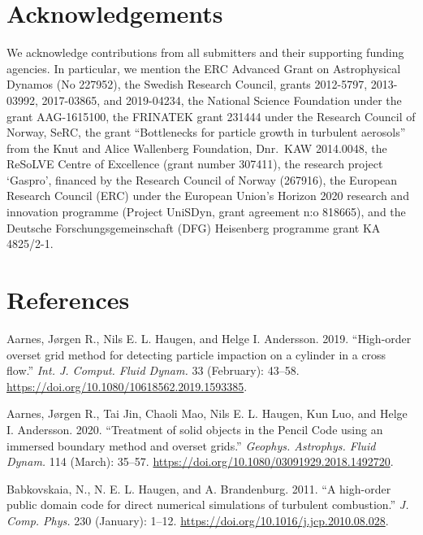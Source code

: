 \documentclass[10pt,a4paper,onecolumn]{article}
\let\textttOrig=\texttt
\def\texttt#1{\expandafter\textttOrig{\seqsplit{#1}}}
\let\addcontentslineOrig=\addcontentsline
\def\addcontentsline#1#2#3{\bgroup
  \let\texttt=\textttOrig\addcontentslineOrig{#1}{#2}{#3}\egroup}
\begin{document}
\hypertarget{acknowledgements}{%
\section{Acknowledgements}\label{acknowledgements}}

We acknowledge contributions from all submitters and their supporting
funding agencies. In particular, we mention the ERC Advanced Grant on
Astrophysical Dynamos (No 227952), the Swedish Research Council, grants
2012-5797, 2013-03992, 2017-03865, and 2019-04234, the National Science
Foundation under the grant AAG-1615100, the FRINATEK grant 231444 under
the Research Council of Norway, SeRC, the grant ``Bottlenecks for
particle growth in turbulent aerosols'' from the Knut and Alice
Wallenberg Foundation, Dnr.~KAW 2014.0048, the ReSoLVE Centre of
Excellence (grant number 307411), the research project `Gaspro',
financed by the Research Council of Norway (267916), the European
Research Council (ERC) under the European Union's Horizon 2020 research
and innovation programme (Project UniSDyn, grant agreement n:o 818665),
and the Deutsche Forschungsgemeinschaft (DFG) Heisenberg programme grant
KA 4825/2-1.

\hypertarget{references}{%
\section*{References}\label{references}}

\hypertarget{refs}{}
\leavevmode\hypertarget{ref-2019IJCFD.33.43A}{}%
Aarnes, Jørgen R., Nils E. L. Haugen, and Helge I. Andersson. 2019.
``High-order overset grid method for detecting particle impaction on a
cylinder in a cross flow.'' \emph{Int. J. Comput. Fluid Dynam.} 33
(February): 43--58. \url{https://doi.org/10.1080/10618562.2019.1593385}.

\leavevmode\hypertarget{ref-2020GApFD.114.35A}{}%
Aarnes, Jørgen R., Tai Jin, Chaoli Mao, Nils E. L. Haugen, Kun Luo, and
Helge I. Andersson. 2020. ``Treatment of solid objects in the Pencil
Code using an immersed boundary method and overset grids.''
\emph{Geophys. Astrophys. Fluid Dynam.} 114 (March): 35--57.
\url{https://doi.org/10.1080/03091929.2018.1492720}.

\leavevmode\hypertarget{ref-2011JCoPh.230.1B}{}%
Babkovskaia, N., N. E. L. Haugen, and A. Brandenburg. 2011. ``A
high-order public domain code for direct numerical simulations of
turbulent combustion.'' \emph{J. Comp. Phys.} 230 (January): 1--12.
\url{https://doi.org/10.1016/j.jcp.2010.08.028}.
\end{document}
